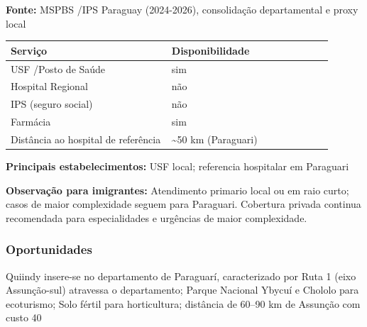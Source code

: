 \textbf{Fonte:} MSPBS /\allowbreak  IPS Paraguay (2024-2026), consolidação
departamental e proxy local

{\def\LTcaptype{none} %
\begin{longtable}{@{}>{\raggedright\arraybackslash}p{0.45\linewidth} >{\raggedright\arraybackslash}p{0.45\linewidth}@{}}
\toprule\noalign{}
Serviço & Disponibilidade \\
\midrule\noalign{}
\endhead
\bottomrule\noalign{}
\endlastfoot
USF /\allowbreak  Posto de Saúde & sim \\
Hospital Regional & não \\
IPS (seguro social) & não \\
Farmácia & sim \\
Distância ao hospital de referência & \textasciitilde50 km
(Paraguari) \\
\end{longtable}
}

\textbf{Principais estabelecimentos:} USF local; referencia hospitalar
em Paraguari

\textbf{Observação para imigrantes:} Atendimento primario local ou em
raio curto; casos de maior complexidade seguem para Paraguari. Cobertura
privada continua recomendada para especialidades e urgências de maior
complexidade.
\newpage

\subsubsection*{Oportunidades}\label{oport-quiindy-0910}
Quiindy insere-se no departamento de Paraguarí, caracterizado por Ruta 1 (eixo Assunção-sul) atravessa o departamento; Parque Nacional Ybycuí e Chololo para ecoturismo; Solo fértil para horticultura; distância de 60–90 km de Assunção com custo 40%

